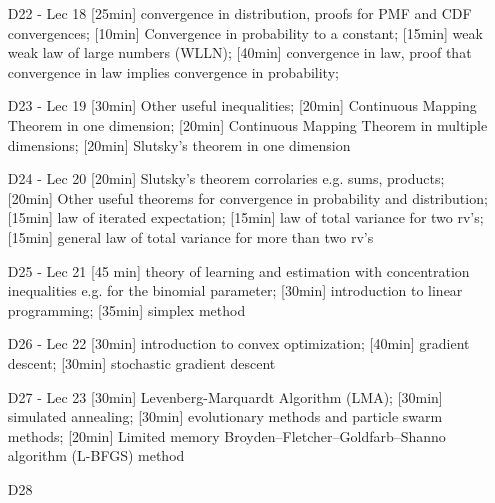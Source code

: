 \begin{enumerate}
\item[D22 - Lec 18] [25min] convergence in distribution, proofs for PMF and CDF convergences; [10min] Convergence in probability to a constant; [15min] weak weak law of large numbers (WLLN); [40min] convergence in law, proof that convergence in law implies convergence in probability; 

\item[D23 - Lec 19] [30min] Other useful inequalities; [20min] Continuous Mapping Theorem in one dimension; [20min] Continuous Mapping Theorem in multiple dimensions; [20min] Slutsky's theorem in one dimension

\item[D24 - Lec 20] [20min] Slutsky's theorem corrolaries e.g. sums, products; [20min] Other useful theorems for convergence in probability and distribution; [15min] law of iterated expectation; [15min] law of total variance for two rv's; [15min] general law of total variance for more than two rv's

\item[D25 - Lec 21] [45 min] theory of learning and estimation with concentration inequalities e.g. for the binomial parameter; [30min] introduction to linear programming; [35min] simplex method

\item[D26 - Lec 22] [30min] introduction to convex optimization; [40min] gradient descent; [30min] stochastic gradient descent

\item[D27 - Lec 23] [30min] Levenberg-Marquardt Algorithm (LMA); [30min] simulated annealing; [30min] evolutionary methods and particle swarm methods; [20min] Limited memory Broyden–Fletcher–Goldfarb–Shanno algorithm (L-BFGS) method

\item[D28] 

\end{enumerate}